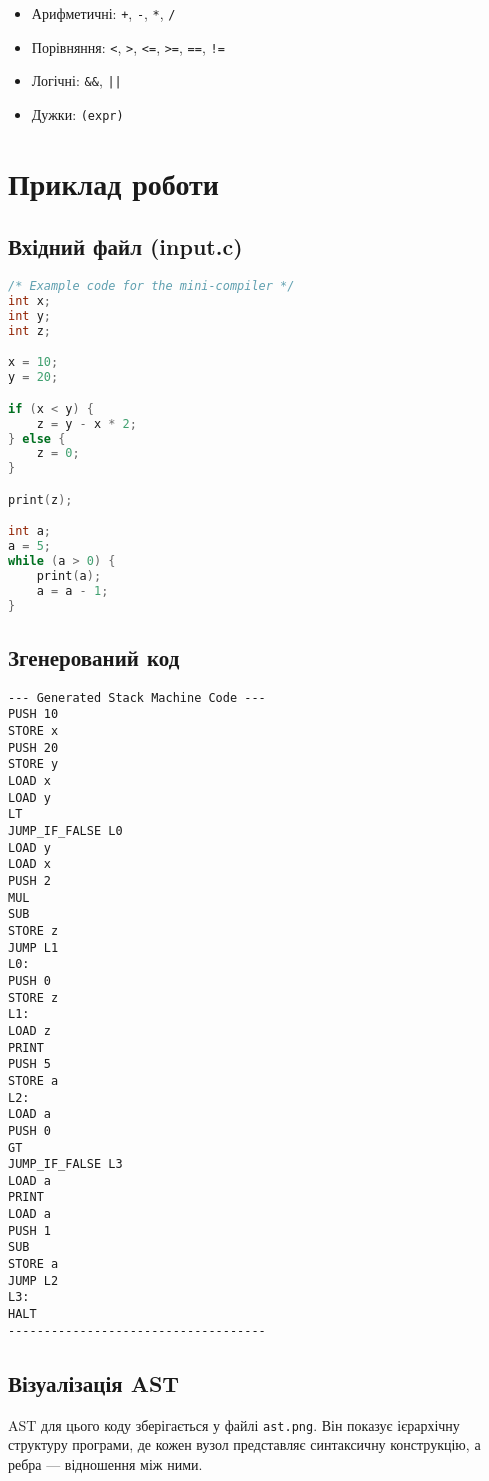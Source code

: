 \documentclass[12pt,a4paper]{article}
\begin{document}
\begin{itemize}
    \item Арифметичні: \texttt{+}, \texttt{-}, \texttt{*}, \texttt{/}
    \item Порівняння: \texttt{<}, \texttt{>}, \texttt{<=}, \texttt{>=}, \texttt{==}, \texttt{!=}
    \item Логічні: \texttt{\&\&}, \texttt{||}
    \item Дужки: \texttt{(expr)}
\end{itemize}

\section{Приклад роботи}

\subsection{Вхідний файл (input.c)}

\begin{lstlisting}[language=C]
/* Example code for the mini-compiler */
int x;
int y;
int z;

x = 10;
y = 20;

if (x < y) {
    z = y - x * 2;
} else {
    z = 0;
}

print(z);

int a;
a = 5;
while (a > 0) {
    print(a);
    a = a - 1;
}
\end{lstlisting}

\subsection{Згенерований код}

\begin{verbatim}
--- Generated Stack Machine Code ---
PUSH 10
STORE x
PUSH 20
STORE y
LOAD x
LOAD y
LT
JUMP_IF_FALSE L0
LOAD y
LOAD x
PUSH 2
MUL
SUB
STORE z
JUMP L1
L0:
PUSH 0
STORE z
L1:
LOAD z
PRINT
PUSH 5
STORE a
L2:
LOAD a
PUSH 0
GT
JUMP_IF_FALSE L3
LOAD a
PRINT
LOAD a
PUSH 1
SUB
STORE a
JUMP L2
L3:
HALT
------------------------------------
\end{verbatim}

\subsection{Візуалізація AST}

AST для цього коду зберігається у файлі \texttt{ast.png}. Він показує ієрархічну структуру програми, де кожен вузол представляє синтаксичну конструкцію, а ребра --- відношення між ними.
\end{document}
